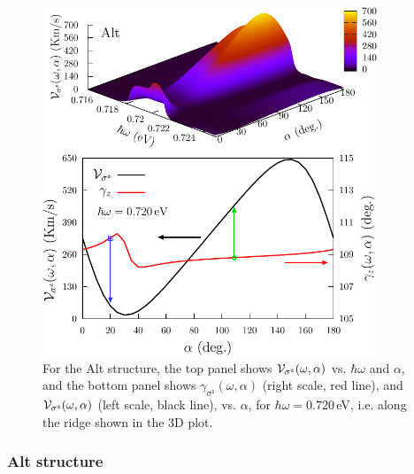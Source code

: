 \documentclass[floatfix,prb,aps,superscriptaddress,showpacs,11pt,preprint,letterpaper]{revtex4}
\def\tama{10cm}
\begin{document}
\begin{figure}[tb]
\centering
\includegraphics[width=\tama]{altplots/alt-vsz}
\caption{For the Alt structure, the top panel shows ${\cal
V}_{\sigma^\mathrm{z}} (\omega,\alpha)$ vs. $\hbar\omega$ and $\alpha$, and the
bottom panel shows $\gamma_{\sigma^\mathrm{z}} (\omega,\alpha)$ (right scale,
red line), and ${\cal V}_{\sigma^\mathrm{z}} (\omega,\alpha)$ (left scale, black
line), vs. $\alpha$, for $\hbar\omega=0.720$\,eV, i.e. along the ridge shown in
the 3D plot.}
\label{fig:alt-vsz}
\end{figure}

\subsubsection{Alt structure}
\end{document}
